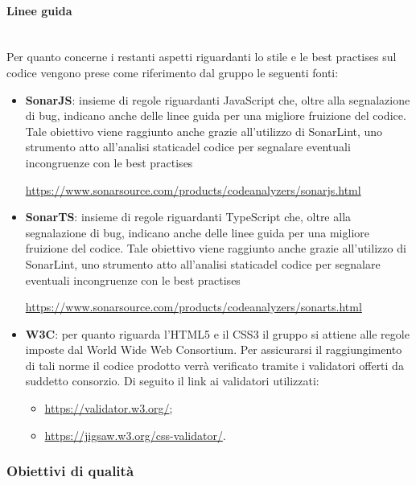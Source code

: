 			\paragraph*{Linee guida}\mbox{}\\ [1mm]
			Per quanto concerne i restanti aspetti riguardanti lo stile e le best practises sul codice vengono prese come riferimento dal gruppo le seguenti fonti:
			\begin{itemize}
				\item \textbf{SonarJS}: insieme di regole riguardanti JavaScript che, oltre alla segnalazione di bug, indicano anche delle linee guida per una migliore fruizione del codice. Tale obiettivo viene raggiunto anche grazie all'utilizzo di SonarLint, uno strumento atto all'analisi statica\glosp del codice per segnalare eventuali incongruenze con le best practises
				\begin{center}
				\url{https://www.sonarsource.com/products/codeanalyzers/sonarjs.html}
				\end{center}	
				\item \textbf{SonarTS}: insieme di regole riguardanti TypeScript che, oltre alla segnalazione di bug, indicano anche delle linee guida per una migliore fruizione del codice. Tale obiettivo viene raggiunto anche grazie all'utilizzo di SonarLint, uno strumento atto all'analisi statica\glosp del codice per segnalare eventuali incongruenze con le best practises
				\begin{center}
				\url{https://www.sonarsource.com/products/codeanalyzers/sonarts.html}
				\end{center}
				\item \textbf{W3C}: per quanto riguarda l'HTML5 e il CSS3 il gruppo si attiene alle regole imposte dal World Wide Web Consortium. Per assicurarsi il raggiungimento di tali norme il codice prodotto verrà verificato tramite i validatori offerti da suddetto consorzio. Di seguito il link ai validatori utilizzati:
				\begin{itemize}
					\item \url{https://validator.w3.org/};
					\item \url{https://jigsaw.w3.org/css-validator/}.
				\end{itemize}
			\end{itemize}
		
	\subsubsection{Obiettivi di qualità}
